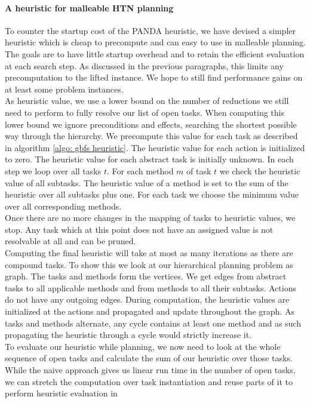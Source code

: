 \paragraph{A heuristic for malleable HTN planning}
To counter the startup cost of the PANDA heuristic, we have devised a simpler heuristic which is cheap to precompute and can easy to use in malleable planning. The goals are to have little startup overhead and to retain the efficient evaluation at each search step. As discussed in the previous paragraphs, this limits any precomputation to the lifted instance. We hope to still find performance gains on at least some problem instances. \\
As heuristic value, we use a lower bound on the number of reductions we still need to perform to fully resolve our list of open tasks. When computing this lower bound we ignore preconditions and effects, searching the shortest possible way through the hierarchy. We precompute this value for each task as described in algorithm \ref{algo: gbfs heuristic}. The heuristic value for each action is initialized to zero. The heuristic value for each abstract task is initially unknown. In each step we loop over all tasks $t$. For each method $m$ of task $t$ we check the heuristic value of all subtasks. The heuristic value of a method is set to the sum of the heuristic over all subtasks plus one. For each task we choose the minimum value over all corresponding methods. \\
Once there are no more changes in the mapping of tasks to heuristic values, we stop. Any task which at this point does not have an assigned value is not resolvable at all and can be pruned. \\
Computing the final heuristic will take at most as many iterations as there are compound tasks. To show this we look at our hierarchical planning problem as graph. The tasks and methods form the vertices. We get edges from abstract tasks to all applicable methods and from methods to all their subtasks. Actions do not have any outgoing edges. During computation, the heuristic values are initialized at the actions and propagated and update throughout the graph. As tasks and methods alternate, any cycle contains at least one method and as such propagating the heuristic through a cycle would strictly increase it.  \\
To evaluate our heuristic while planning, we now need to look at the whole sequence of open tasks and calculate the sum of our heuristic over those tasks. While the naive approach gives us linear run time in the number of open tasks, we can stretch the computation over task instantiation and reuse parts of it to perform heuristic evaluation in
